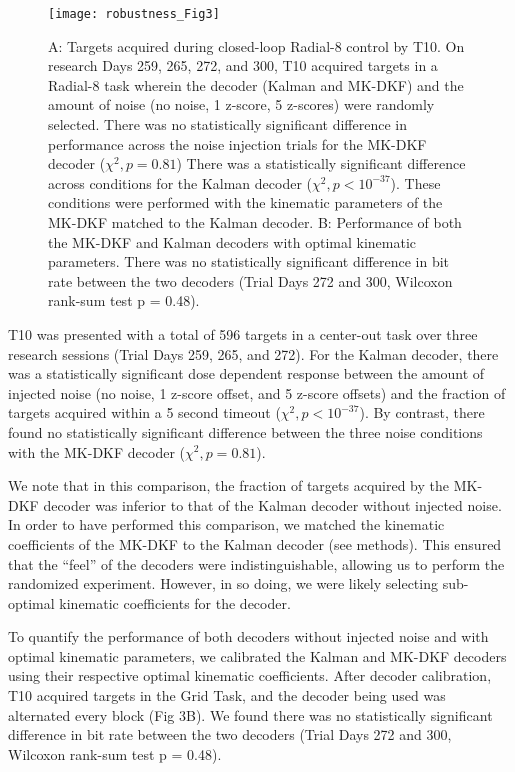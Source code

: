 \begin{figure}[h]
\centering
\texttt{[image: robustness\_Fig3]}
\caption[Online performance comparison of nonstationary noise injection on Kalman and MK-DKF decoders]{A: Targets acquired during closed-loop Radial-8 control by T10. On research Days 259, 265, 272, and 300, T10 acquired targets in a Radial-8 task wherein the decoder (Kalman and MK-DKF) and the amount of noise (no noise, 1 z-score, 5 z-scores) were randomly selected. There was no statistically significant difference in performance across the noise injection trials for the MK-DKF decoder ($\chi^2, p = 0.81$) There was a statistically significant difference across conditions for the Kalman decoder ($\chi^2, p < 10^{-37}$). These conditions were performed with the kinematic parameters of the MK-DKF matched to the Kalman decoder. B: Performance of both the MK-DKF and Kalman decoders with optimal kinematic parameters. There was no statistically significant difference in bit rate between the two decoders (Trial Days 272 and 300, Wilcoxon rank-sum test p = 0.48).}
\label{fig:Fig3}
\end{figure}

T10 was presented with a total of 596 targets in a center-out task over three research sessions (Trial Days 259, 265, and 272). For the Kalman decoder, there was a statistically significant dose dependent response between the amount of injected noise (no noise, 1 z-score offset, and 5 z-score offsets) and the fraction of targets acquired within a 5 second timeout ($\chi^2, p < 10^{-37}$). By contrast, there found no statistically significant difference between the three noise conditions with the MK-DKF decoder ($\chi^2, p = 0.81$). 

We note that in this comparison, the fraction of targets acquired by the MK-DKF decoder was inferior to that of the Kalman decoder without injected noise. In order to have performed this comparison, we matched the kinematic coefficients of the MK-DKF to the Kalman decoder (see methods). This ensured that the ``feel'' of the decoders were indistinguishable, allowing us to perform the randomized experiment. However, in so doing, we were likely selecting sub-optimal kinematic coefficients for the decoder.

To quantify the performance of both decoders without injected noise and with optimal kinematic parameters, we calibrated the Kalman and MK-DKF decoders using their respective optimal kinematic coefficients. After decoder calibration, T10 acquired targets in the Grid Task, and the decoder being used was alternated every block (Fig 3B). We found there was no statistically significant difference in bit rate between the two decoders (Trial Days 272 and 300, Wilcoxon rank-sum test p = 0.48). 

